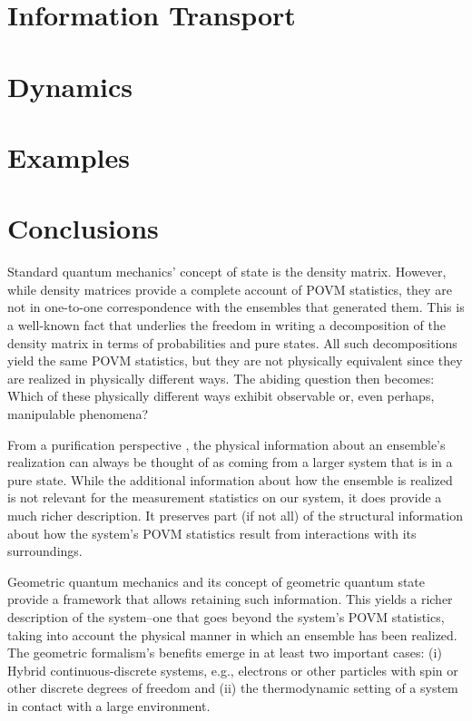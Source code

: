 \documentclass[draft,nofootinbib,pre,twocolumn,showpacs,showkeys,preprintnumbers,floatfix]{revtex4-1}
\newcommand{\1}{\mathbbm{1}}
\begin{document}
\section{Information Transport}
\label{sec:IT}

\section{Dynamics}
\label{sec:DYN}

\section{Examples}
\label{sec:EXAMPLES}

\section{Conclusions}
\label{sec:FINAL}

Standard quantum mechanics' concept of state is the density matrix. However,
while density matrices provide a complete account of POVM statistics, they are
not in one-to-one correspondence with the ensembles that generated them. This
is a well-known fact that underlies the freedom in writing a decomposition of
the density matrix in terms of probabilities and pure states.  All such
decompositions yield the same POVM statistics, but they are not physically
equivalent since they are realized in physically different ways. The abiding
question then becomes: Which of these physically different ways exhibit
observable or, even perhaps, manipulable phenomena?

From a purification perspective \cite{Wilde2017}, the physical information
about an ensemble's realization can always be thought of as coming from a
larger system that is in a pure state. While the additional information about
how the ensemble is realized is not relevant for the measurement statistics on
our system, it does provide a much richer description. It preserves part (if
not all) of the structural information about how the system's POVM statistics
result from interactions with its surroundings.
 
Geometric quantum mechanics and its concept of geometric quantum state provide
a framework that allows retaining such information. This yields a richer
description of the system--one that goes beyond the system's POVM statistics, 
taking into account the physical manner in which an ensemble has been realized.
The geometric formalism's benefits emerge in at least two important cases:
(i) Hybrid continuous-discrete systems, e.g., electrons or other particles with
spin or other discrete degrees of freedom and (ii) the thermodynamic setting
of a system in contact with a large environment.
\end{document}
